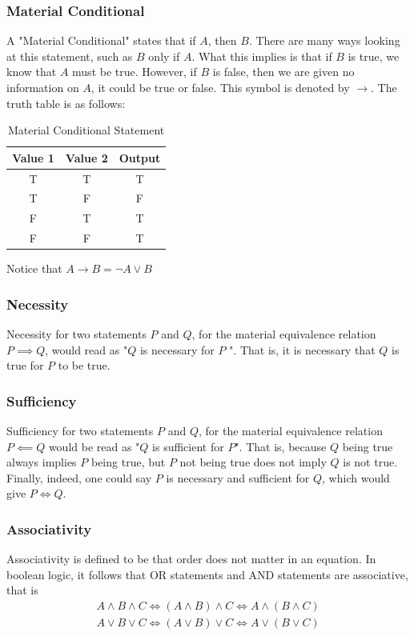 \documentclass[a4paper]{article}
\theoremstyle{plain}
\theoremstyle{definition}
\theoremstyle{remark}
\begin{document}
\subsubsection{Material Conditional}
A "Material Conditional" states that if $A$, then $ B$. There are many ways looking at this statement, such as $B$ only if $A$. What this implies is that if $B$ is true, we know that $A$ must be true. However, if $B$ is false, then we are given no information on $A$, it could be true or false. This symbol is denoted by $\to $. The truth table is as follows:
\begin{table}[H]
	\centering
	\caption{Material Conditional Statement}
	\label{tab:Material Conditional}
	\begin{tabular}{ccc}
		\hline
		Value 1 & Value 2  & Output \\
		\hline
		T & T & T \\
		T & F & F \\
		F & T & T \\
		F & F & T \\
		\hline
	\end{tabular}
\end{table}
Notice that $A \to B = \neg A \lor B$
\subsubsection{Necessity}
Necessity for two statements $P$ and $Q$, for the material equivalence relation $P \implies Q$, would read as "$Q$ is necessary for $P$ ". That is, it is necessary that $Q$ is true for $P$ to be true.
\subsubsection{Sufficiency}
Sufficiency for two statements $P$ and $Q$, for the material equivalence relation $P \impliedby Q$ would be read as "$Q$ is sufficient for $P$". That is, because $Q$ being true always implies $P$ being true, but $P$ not being true does not imply $Q$ is not true. Finally, indeed, one could say $P$ is necessary and sufficient for $Q$, which would give $P \iff Q$.
\subsubsection{Associativity}
Associativity is defined to be that order does not matter in an equation. In boolean logic, it follows that OR statements and AND statements are associative, that is
\begin{align*}
	A \land B \land C \iff (A \land B) \land C \iff A \land (B \land C)\\
	A \lor B \lor C \iff \left( A \lor B \right) \lor C \iff A \lor \left( B \lor C \right) 
\end{align*}
\end{document}
